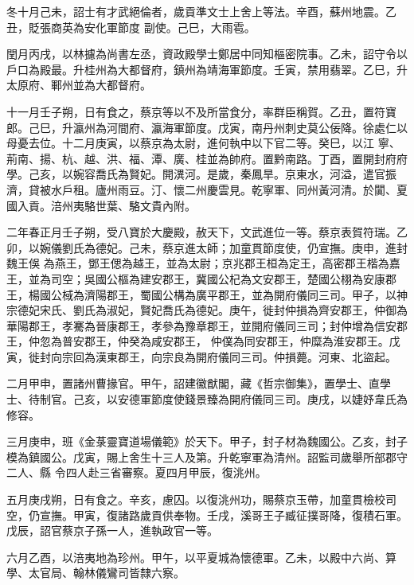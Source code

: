 \begin{pinyinscope}
 冬十月己未，詔士有才武絕倫者，歲貢準文士上舍上等法。辛酉，蘇州地震。乙丑，貶張商英為安化軍節度
 副使。己巳，大雨雹。



 閏月丙戌，以林攄為尚書左丞，資政殿學士鄭居中同知樞密院事。乙未，詔守令以戶口為殿最。升桂州為大都督府，鎮州為靖海軍節度。壬寅，禁用翡翠。乙巳，升太原府、鄆州並為大都督府。



 十一月壬子朔，日有食之，蔡京等以不及所當食分，率群臣稱賀。乙丑，置符寶郎。己巳，升瀛州為河間府、瀛海軍節度。戊寅，南丹州刺史莫公佞降。徐處仁以母憂去位。十二月庚寅，以蔡京為太尉，進何執中以下官二等。癸巳，以江
 寧、荊南、揚、杭、越、洪、福、潭、廣、桂並為帥府。置黔南路。丁酉，置開封府府學。己亥，以婉容喬氏為賢妃。開潩河。是歲，秦鳳旱。京東水，河溢，遣官振濟，貸被水戶租。廬州雨豆。汀、懷二州慶雲見。乾寧軍、同州黃河清。於闐、夏國入貢。涪州夷駱世葉、駱文貴內附。



 二年春正月壬子朔，受八寶於大慶殿，赦天下，文武進位一等。蔡京表賀符瑞。乙卯，以婉儀劉氏為德妃。己未，蔡京進太師；加童貫節度使，仍宣撫。庚申，進封魏王俁
 為燕王，鄧王偲為越王，並為太尉；京兆郡王桓為定王，高密郡王楷為嘉王，並為司空；吳國公樞為建安郡王，冀國公杞為文安郡王，楚國公栩為安康郡王，楊國公棫為濟陽郡王，蜀國公構為廣平郡王，並為開府儀同三司。甲子，以神宗德妃宋氏、劉氏為淑妃，賢妃喬氏為德妃。庚午，徙封仲損為齊安郡王，仲御為華陽郡王，孝騫為晉康郡王，孝參為豫章郡王，並開府儀同三司；封仲增為信安郡王，仲忽為普安郡王，仲癸為咸安郡王，
 仲僕為同安郡王，仲糜為淮安郡王。戊寅，徙封向宗回為漢東郡王，向宗良為開府儀同三司。仲損薨。河東、北盜起。



 二月甲申，置諸州曹掾官。甲午，詔建徽猷閣，藏《哲宗御集》，置學士、直學士、待制官。己亥，以安德軍節度使錢景臻為開府儀同三司。庚戌，以婕妤韋氏為修容。



 三月庚申，班《金菉靈寶道場儀範》於天下。甲子，封子材為魏國公。乙亥，封子模為鎮國公。戊寅，賜上舍生十三人及第。升乾寧軍為清州。詔監司歲舉所部郡守二人、縣
 令四人赴三省審察。夏四月甲辰，復洮州。



 五月庚戌朔，日有食之。辛亥，慮囚。以復洮州功，賜蔡京玉帶，加童貫檢校司空，仍宣撫。甲寅，復諸路歲貢供奉物。壬戌，溪哥王子臧征撲哥降，復積石軍。戊辰，詔官蔡京子孫一人，進執政官一等。



 六月乙酉，以涪夷地為珍州。甲午，以平夏城為懷德軍。乙未，以殿中六尚、算學、太官局、翰林儀鸞司皆隸六察。




\end{pinyinscope}
